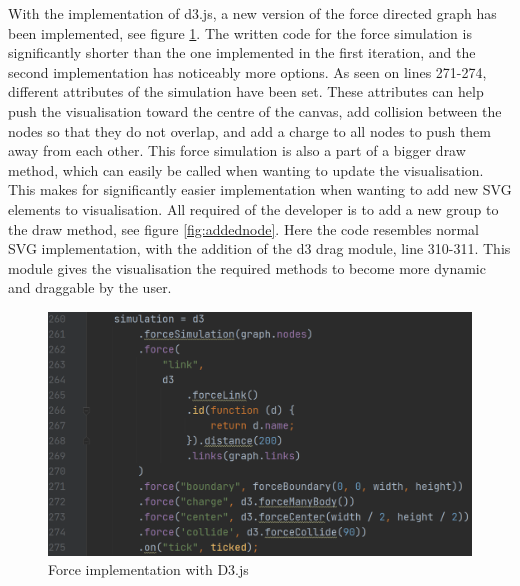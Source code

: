 With the implementation of d3.js, a new version of the force directed graph has been implemented, see figure \ref{fig:forceimplementation}. The written code for the force simulation is significantly shorter than the one implemented in the first iteration, and the second implementation has noticeably more options. As seen on lines 271-274, different attributes of the simulation have been set. These attributes can help push the visualisation toward the centre of the canvas, add collision between the nodes so that they do not overlap, and add a charge to all nodes to push them away from each other. This force simulation is also a part of a bigger draw method, which can easily be called when wanting to update the visualisation. This makes for significantly easier implementation when wanting to add new SVG elements to visualisation. All required of the developer is to add a new group to the draw method, see figure \ref{fig:addednode}. Here the code resembles normal SVG implementation, with the addition of the d3 drag module, line 310-311. This module gives the visualisation the required methods to become more dynamic and draggable by the user.

\begin{figure}[H]
    \centering
    \includegraphics[width=1\textwidth]{figures/force-implementation.pdf}
    \caption{Force implementation with D3.js}
    \label{fig:forceimplementation}
\end{figure}

